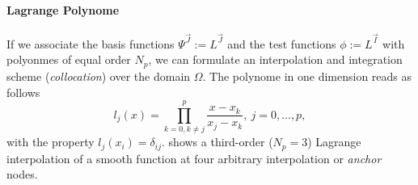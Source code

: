 \paragraph{Lagrange Polynome}
If we associate the basis functions $\Psi^{\vec{J}} := L^{\vec{J}}$ and the
test functions $\phi := L^{\vec{I}}$ with  polyonmes of equal
order $N_p$, we can formulate an interpolation and integration scheme
(\emph{collocation}) over the domain $\Omega$. The polynome in one dimension
reads as follows
\begin{equation}
l_j(x) = \prod^p_{k=0,k\neq j} \frac{x-x_k}{x_j-x_k}, \ j = 0,\dots,p,
\end{equation}
with the  property $l_j(x_i) = \delta_{ij}$.
 shows a third-order ($N_p = 3$)
Lagrange interpolation of a smooth function at four arbitrary
interpolation or \emph{anchor} nodes.


